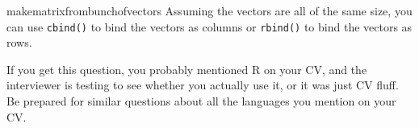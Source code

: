 \begin{answer}{makematrixfrombunchofvectors}
Assuming the vectors are all of the same size, you can use
\verb+cbind()+ to bind the vectors as columns
or
\verb+rbind()+
to bind the vectors as rows.

If you get this question, you probably mentioned R \citep{RCoreTeam} on your CV, and the interviewer is testing to see whether you actually use it, or it was just CV fluff.
Be prepared for similar questions about all the languages you mention on your CV.
\end{answer}
